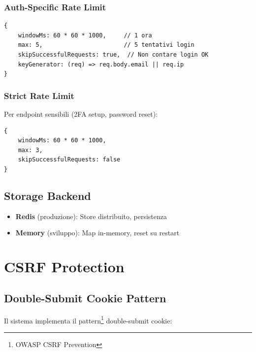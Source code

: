 \documentclass[12pt,a4paper]{report}
\begin{document}
\subsection{Auth-Specific Rate Limit}

\begin{lstlisting}[caption={Auth Limiter Configuration}]
{
    windowMs: 60 * 60 * 1000,     // 1 ora
    max: 5,                       // 5 tentativi login
    skipSuccessfulRequests: true,  // Non contare login OK
    keyGenerator: (req) => req.body.email || req.ip
}
\end{lstlisting}

\subsection{Strict Rate Limit}

Per endpoint sensibili (2FA setup, password reset):

\begin{lstlisting}[caption={Strict Limiter}]
{
    windowMs: 60 * 60 * 1000,
    max: 3,
    skipSuccessfulRequests: false
}
\end{lstlisting}

\section{Storage Backend}

\begin{itemize}
    \item \textbf{Redis} (produzione): Store distribuito, persistenza
    \item \textbf{Memory} (sviluppo): Map in-memory, reset su restart
\end{itemize}

\chapter{CSRF Protection}

\section{Double-Submit Cookie Pattern}

Il sistema implementa il pattern\footnote{OWASP CSRF Prevention} double-submit cookie:
\end{document}
